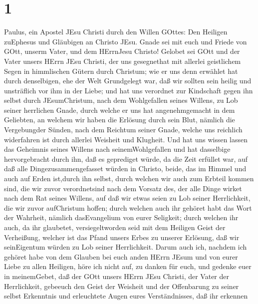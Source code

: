 \hypertarget{section}{%
\section{1}\label{section}}

 Paulus, ein Apostel JEsu Christi durch den Willen GOttes:
Den Heiligen zuEphesus und Gläubigen an Christo JEsu.  Gnade
sei mit euch und Friede von GOtt, unserm Vater, und dem HErrnJesu
Christo!  Gelobet sei GOtt und der Vater unsers HErrn JEsu
Christi, der uns gesegnethat mit allerlei geistlichem Segen in
himmlischen Gütern durch Christum;  wie er uns denn erwählet
hat durch denselbigen, ehe der Welt Grundgelegt war, daß wir sollten
sein heilig und unsträflich vor ihm in der Liebe;  und hat
uns verordnet zur Kindschaft gegen ihn selbst durch JEsumChristum, nach
dem Wohlgefallen seines Willens,  zu Lob seiner herrlichen
Gnade, durch welche er uns hat angenehmgemacht in dem Geliebten,
 an welchem wir haben die Erlösung durch sein Blut, nämlich
die Vergebungder Sünden, nach dem Reichtum seiner Gnade, 
welche uns reichlich widerfahren ist durch allerlei Weisheit und
Klugheit.  Und hat uns wissen lassen das Geheimnis seines
Willens nach seinemWohlgefallen und hat dasselbige hervorgebracht durch
ihn,  daß es geprediget würde, da die Zeit erfüllet war,
auf daß alle Dingezusammengefasset würden in Christo, beide, das im
Himmel und auch auf Erden ist,durch ihn selbst,  durch
welchen wir auch zum Erbteil kommen sind, die wir zuvor verordnetsind
nach dem Vorsatz des, der alle Dinge wirket nach dem Rat seines Willens,
 auf daß wir etwas seien zu Lob seiner Herrlichkeit, die
wir zuvor aufChristum hoffen;  durch welchen auch ihr
gehöret habt das Wort der Wahrheit, nämlich dasEvangelium von eurer
Seligkeit; durch welchen ihr auch, da ihr glaubetet, versiegeltworden
seid mit dem Heiligen Geist der Verheißung,  welcher ist
das Pfand unsers Erbes zu unserer Erlösung, daß wir seinEigentum würden
zu Lob seiner Herrlichkeit.  Darum auch ich, nachdem ich
gehöret habe von dem Glauben bei euch anden HErrn JEsum und von eurer
Liebe zu allen Heiligen,  höre ich nicht auf, zu danken für
euch, und gedenke euer in meinemGebet,  daß der GOtt unsers
HErrn JEsu Christi, der Vater der Herrlichkeit, gebeeuch den Geist der
Weisheit und der Offenbarung zu seiner selbst Erkenntnis 
und erleuchtete Augen eures Verständnisses, daß ihr erkennen
